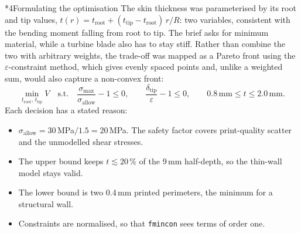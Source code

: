 \documentclass[10pt,a4paper]{article}
\makeatletter
\renewcommand\section{\@startsection{section}{1}{0pt}{8pt plus 2pt}{3pt}{\large\bfseries}}
\makeatother
\begin{document}
\section*{4\quad Formulating the optimisation}
The skin thickness was parameterised by its root and tip values,
$t(r)=t_{\mathrm{root}}+(t_{\mathrm{tip}}-t_{\mathrm{root}})\,r/R$: two variables,
consistent with the bending moment falling from root to tip. The brief asks for minimum
material, while a turbine blade also has to stay stiff. Rather than combine the two
with arbitrary weights, the trade-off was mapped as a Pareto front using the
$\varepsilon$-constraint method, which gives evenly spaced points and, unlike a weighted
sum, would also capture a non-convex front:
\begin{equation}
  \min_{t_{\mathrm{root}},\,t_{\mathrm{tip}}} V
  \quad\text{s.t.}\quad
  \frac{\sigma_{\max}}{\sigma_{\mathrm{allow}}}-1\le 0,\qquad
  \frac{\delta_{\mathrm{tip}}}{\varepsilon}-1\le 0,\qquad
  0.8\,\mathrm{mm}\le t\le 2.0\,\mathrm{mm}.
\end{equation}
Each decision has a stated reason:
\begin{itemize}
  \item $\sigma_{\mathrm{allow}}=30$\,MPa$/1.5=20$\,MPa. The safety factor covers
  print-quality scatter and the unmodelled shear stresses.
  \item The upper bound keeps $t\lesssim 20\,\%$ of the 9\,mm half-depth, so the
  thin-wall model stays valid.
  \item The lower bound is two 0.4\,mm printed perimeters, the minimum for a
  structural wall.
  \item Constraints are normalised, so that \texttt{fmincon} sees terms of order one.
\end{itemize}
\end{document}
